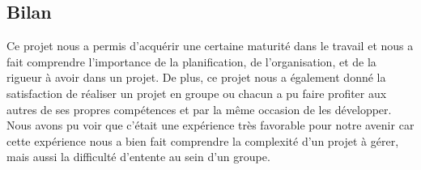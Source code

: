 \documentclass[12pt,a4paper]{article}
\begin{document}
\subsection{Bilan}

Ce projet nous a permis d’acquérir une certaine maturité dans le travail et nous a fait comprendre l’importance de la planification, de l’organisation, et de la rigueur à avoir dans un projet. De plus, ce projet nous a également donné la satisfaction de réaliser un projet en groupe ou chacun a pu faire profiter aux autres de ses propres compétences et par la même occasion de les développer.
Nous avons pu voir que c'était une expérience très favorable pour notre avenir car cette
expérience nous a bien fait comprendre la complexité d’un projet à gérer, mais aussi la difficulté d’entente au sein d’un groupe.
\end{document}
